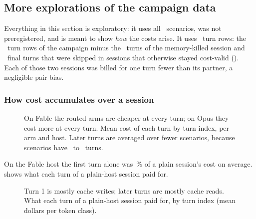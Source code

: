 \subsection{More explorations of the campaign data \texorpdfstring{\screen}{[screen]}}\label{vt:sec:more}

Everything in this section is exploratory: it uses all \NScenarios\ scenarios, was not preregistered, and is
meant to show \emph{how} the costs arise. It uses \PerTurnNFmt\ turn rows: the \NTurns\ turn rows of the campaign minus the \RvKilledTurns\ turns of the
memory-killed session and \RvNSkips\ final turns that were skipped in sessions that otherwise stayed cost-valid
(\RvSkipList). Each of those two sessions was billed for one turn fewer than its partner, a negligible pair bias.

\subsubsection{How cost accumulates over a session}

\begin{figure}[tbp]
\centering
{}\par\smallskip

\caption{On Fable the routed arms are cheaper at every turn; on Opus they cost more at every turn. Mean cost of each turn by turn index, per arm and host. Later turns are averaged over fewer scenarios,
because scenarios have \MinTurns\ to \MaxTurns\ turns.}
\label{vt:fig:perturn}
\end{figure}

On the Fable host the first turn alone was \TurnOneShareFable\,\% of a plain session's cost on average.
 shows what each turn of a plain-host session paid for.

\begin{figure}[tbp]
\centering
{}\par\smallskip

\caption{Turn 1 is mostly cache writes; later turns are mostly cache reads. What each turn of a plain-host session paid for, by turn index (mean dollars per token class).}
\label{vt:fig:turncomp}
\end{figure}

